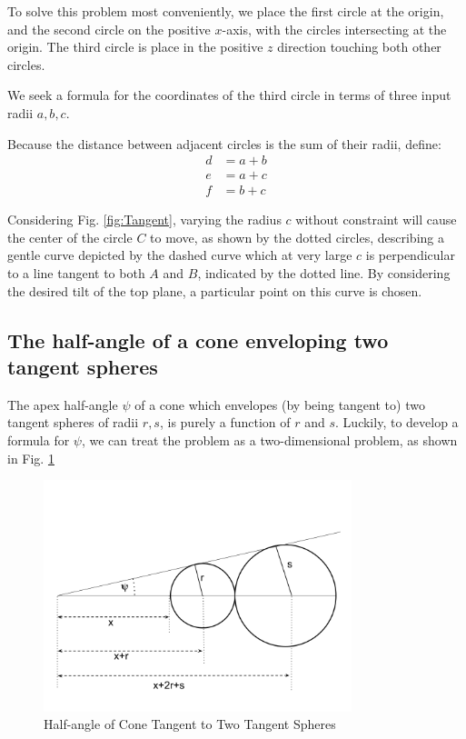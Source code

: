 \documentclass{article}
\begin{document}
To solve this problem most conveniently, we place the first circle at the origin, and the second circle
on the positive $x$-axis, with the circles intersecting at the origin.
The third circle is place in the positive $z$ direction touching both other circles.

We seek a formula for the coordinates of the third circle in terms of three input radii $a,b,c$.

Because the distance between adjacent circles is the sum of their radii, define:
\begin{align}
  d  &= a + b \\
  e  &= a + c \\
  f  &= b + c
\end{align}

Considering Fig. \ref{fig:Tangent}, varying the radius $c$ without constraint will cause
the center of the circle $C$ to move, as shown by the dotted circles,
describing a gentle curve depicted by the dashed curve which at very large $c$ is perpendicular to a
line tangent to both $A$ and $B$, indicated by the dotted line.
By considering the desired tilt of the top plane,
a particular point on this curve is chosen.

\subsection{The half-angle of a cone enveloping two tangent spheres}

The apex half-angle $\psi$ of a cone which envelopes (by being tangent to) two tangent
spheres of radii $r,s$, is purely a function of $r$ and $s$.
Luckily, to develop a formula for $\psi$, we can treat the problem as a two-dimensional problem,
as shown in Fig. \ref{fig:conehalf}


\begin{figure}
     \centering
     \includegraphics[width=0.8\textwidth]{figures/HalfAngleOfConeTangenttoTwoTangentSpheres.png}
     \caption{Half-angle of Cone Tangent to Two Tangent Spheres}
  \label{fig:conehalf}
\end{figure}
\end{document}
